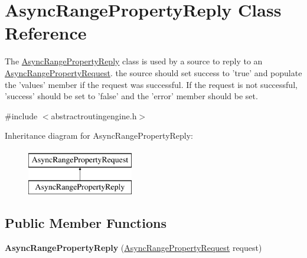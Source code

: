 \hypertarget{classAsyncRangePropertyReply}{\section{Async\-Range\-Property\-Reply Class Reference}
\label{classAsyncRangePropertyReply}
}


The \hyperlink{classAsyncRangePropertyReply}{Async\-Range\-Property\-Reply} class is used by a source to reply to an \hyperlink{classAsyncRangePropertyRequest}{Async\-Range\-Property\-Request}. the source should set success to 'true' and populate the 'values' member if the request was successful. If the request is not successful, 'success' should be set to 'false' and the 'error' member should be set.  




{\ttfamily \#include $<$abstractroutingengine.\-h$>$}

Inheritance diagram for Async\-Range\-Property\-Reply\-:\begin{figure}[H]
\begin{center}
\leavevmode
\includegraphics[height=2.000000cm]{classAsyncRangePropertyReply}
\end{center}
\end{figure}
\subsection*{Public Member Functions}
\begin{DoxyCompactItemize}
\item 
\hypertarget{classAsyncRangePropertyReply_ac253016c5ff4dc8e0ac11f8e98a16025}{{\bfseries Async\-Range\-Property\-Reply} (\hyperlink{classAsyncRangePropertyRequest}{Async\-Range\-Property\-Request} request)}\label{classAsyncRangePropertyReply_ac253016c5ff4dc8e0ac11f8e98a16025}

\end{DoxyCompactItemize}
